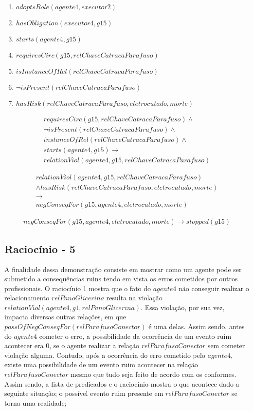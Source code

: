 \begin{enumerate}
	\item $adoptsRole(agente4,executor2)$
	\item $hasObligation(executor4,g15)$	
	\item $starts(agente4,g15)$ 
	\item $requiresCirc(g15,relChaveCatracaParafuso)$
	\item $isInstanceOfRel(relChaveCatracaParafuso)$	
	\item $\neg isPresent(relChaveCatracaParafuso)$
	\item $hasRisk(relChaveCatracaParafuso,eletrocutado,morte)$
\end{enumerate}

\begin{eqnarray}
	requiresCirc(g15,relChaveCatracaParafuso)\wedge \nonumber \\
	\neg isPresent(relChaveCatracaParafuso) \wedge \nonumber \\
	instanceOfRel(relChaveCatracaParafuso) \wedge \nonumber \\
	starts(agente4,g15) \to \nonumber \\
	relationViol(agente4,g15,relChaveCatracaParafuso) \nonumber
\end{eqnarray}

\begin{eqnarray}\nonumber
	relationViol(agente4,g15,relChaveCatracaParafuso) \nonumber \\ 
	 \wedge hasRisk(relChaveCatracaParafuso,eletrocutado,morte) \nonumber \\ 
	\to \nonumber \\ 
	negConseqFor(g15,agente4,eletrocutado,morte)
\end{eqnarray}

\begin{eqnarray}
		negConseqFor(g15,agente4,eletrocutado,morte) \to stopped(g15)
\end{eqnarray}

\subsection{Raciocínio - 5} 
\label{raciocinio5}
A finalidade dessa demonstração consiste em mostrar como um agente pode ser submetido a consequências ruins tendo em vista os erros cometidos por outros profissionais. O raciocínio 1 mostra que o fato do $agente4$ não conseguir realizar o relacionamento $relPanoGlicerina$ resulta na violação $relationViol(agente4,g1,relPanoGlicerina)$. Essa violação, por sua vez, impacta diversas outras relações, em que $possOfNegConseqFor(relParafusoConector)$ é uma delas. Assim sendo, antes do $agente4$ cometer o erro, a possibilidade da ocorrência de um evento ruim acontecer era 0, se o agente realizar a relação $relParafusoConector$ sem cometer violação alguma. Contudo, após a ocorrência do erro cometido pelo $agente4$, existe uma possibilidade de um evento ruim acontecer na relação $relParafusoConector$ mesmo que tudo seja feito de acordo com os conformes. Assim sendo, a lista de predicados e o raciocínio mostra o que acontece dado a seguinte situação; o possível evento ruim presente em $relParafusoConector$ se torna uma realidade;  

